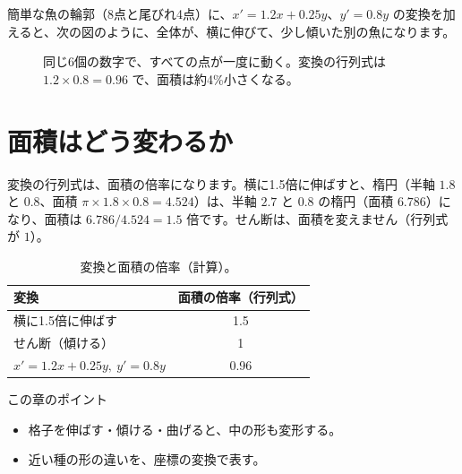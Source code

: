 \documentclass[a4paper,11pt,openany]{ltjsbook}
\begin{document}
簡単な魚の輪郭（8点と尾びれ4点）に、$x'=1.2x+0.25y$、$y'=0.8y$ の変換を加えると、次の図のように、全体が、横に伸びて、少し傾いた別の魚になります。

\begin{figure}[htbp]
\centering
{}
\caption{同じ6個の数字で、すべての点が一度に動く。変換の行列式は $1.2\times0.8=0.96$ で、面積は約4\%小さくなる。}
\end{figure}

\section{面積はどう変わるか}

変換の行列式は、面積の倍率になります。横に1.5倍に伸ばすと、楕円（半軸 $1.8$ と $0.8$、面積 $\pi\times1.8\times0.8=4.524$）は、半軸 $2.7$ と $0.8$ の楕円（面積 $6.786$）になり、面積は $6.786/4.524=1.5$ 倍です。せん断は、面積を変えません（行列式が $1$）。

\begin{table}[htbp]
\centering
\begin{tabular}{lc}
\toprule
変換 & 面積の倍率（行列式）\\
\midrule
横に1.5倍に伸ばす & 1.5\\
せん断（傾ける） & 1\\
$x'=1.2x+0.25y,\ y'=0.8y$ & 0.96\\
\bottomrule
\end{tabular}
\caption{変換と面積の倍率（計算）。}
\end{table}

\begin{pointbox}{この章のポイント}
\begin{itemize}[leftmargin=1.5em]
\item 格子を伸ばす・傾ける・曲げると、中の形も変形する。
\item 近い種の形の違いを、座標の変換で表す。
\end{itemize}
\end{pointbox}
\end{document}
